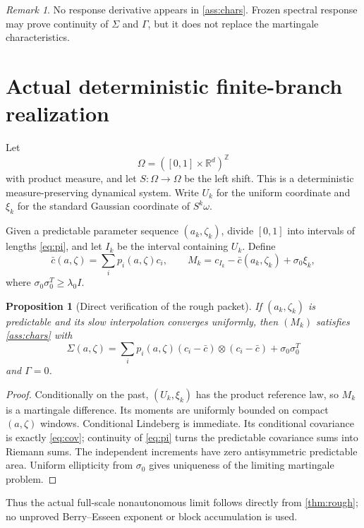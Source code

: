 \documentclass[11pt,reqno]{amsart}
\newtheorem{proposition}[theorem]{Proposition}
\theoremstyle{definition}
\theoremstyle{remark}
\newtheorem{remark}[theorem]{Remark}
\newcommand{\R}{\mathbb R}
\begin{document}
\begin{remark}
No response derivative appears in \cref{ass:chars}.  Frozen spectral response
may prove continuity of $\Sigma$ and $\Gamma$, but it does not replace the
martingale characteristics.
\end{remark}

\section{Actual deterministic finite-branch realization}\label{sec:actualrough}

Let
\[
 \Omega=([0,1]\times\R^d)^{\mathbb Z}
\]
with product measure, and let $S:\Omega\to\Omega$ be the left shift.  This is a
deterministic measure-preserving dynamical system.  Write $U_k$ for the uniform
coordinate and $\xi_k$ for the standard Gaussian coordinate of $S^k\omega$.

Given a predictable parameter sequence $(a_k,\zeta_k)$, divide $[0,1]$ into
intervals of lengths \eqref{eq:pi}, and let $I_k$ be the interval containing
$U_k$.  Define
\[
 \bar c(a,\zeta)=\sum_ip_i(a,\zeta)c_i,
 \qquad
 M_k=c_{I_k}-\bar c(a_k,\zeta_k)+\sigma_0\xi_k,
\]
where $\sigma_0\sigma_0^T\ge\lambda_0I$.

\begin{proposition}[Direct verification of the rough packet]\label{prop:actualrough}
If $(a_k,\zeta_k)$ is predictable and its slow interpolation converges
uniformly, then $(M_k)$ satisfies \cref{ass:chars} with
\begin{equation}\label{eq:cov}
 \Sigma(a,\zeta)=
 \sum_ip_i(a,\zeta)
 (c_i-\bar c)\otimes(c_i-\bar c)+\sigma_0\sigma_0^T
\end{equation}
and $\Gamma=0$.
\end{proposition}

\begin{proof}
Conditionally on the past, $(U_k,\xi_k)$ has the product reference law, so
$M_k$ is a martingale difference.  Its moments are uniformly bounded on
compact $(a,\zeta)$ windows.  Conditional Lindeberg is immediate.  Its
conditional covariance is exactly \eqref{eq:cov}; continuity of
\eqref{eq:pi} turns the predictable covariance sums into Riemann sums.  The
independent increments have zero antisymmetric predictable area.  Uniform
ellipticity from $\sigma_0$ gives uniqueness of the limiting martingale
problem.
\end{proof}

Thus the actual full-scale nonautonomous limit follows directly from
\cref{thm:rough}; no unproved Berry--Esseen exponent or block accumulation is
used.
\end{document}
